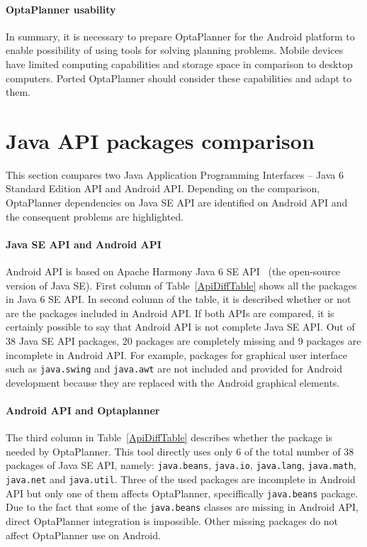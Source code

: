 \paragraph{OptaPlanner usability}
In summary, it is necessary to prepare OptaPlanner for the Android platform to enable possibility of using tools for
solving planning problems. Mobile devices have limited computing capabilities and storage space in comparison to desktop
computers. Ported OptaPlanner should consider these capabilities and adapt to them.

\section{Java API packages comparison}\label{ComparsionSection}
This section compares two Java Application Programming Interfaces -- Java 6 Standard Edition API and Android API.
Depending on the comparison, OptaPlanner dependencies on Java SE API are identified on Android API and the consequent
problems are highlighted.

\paragraph{Java SE API and Android API}
Android API is based on Apache Harmony Java 6 SE API~\cite{Apache} (the open-source version of Java SE). First column of
Table~\ref{ApiDiffTable} shows all the packages in Java 6 SE API. In second column of the table, it is described whether
or not are the packages included in Android API. If both APIs are compared, it is certainly possible to say that Android
API is not complete Java SE API. Out of 38 Java SE API packages, 20 packages are completely missing and 9 packages are
incomplete in Android API. For example, packages for graphical user interface such as \texttt{java.swing} and
\texttt{java.awt} are not included and provided for Android development because they are replaced with the Android
graphical elements.

\paragraph{Android API and Optaplanner}
The third column in Table~\ref{ApiDiffTable} describes whether the package is needed by OptaPlanner. This tool directly
uses only 6 of the total number of 38 packages of Java SE API, namely: \texttt{java.beans}, \texttt{java.io},
\texttt{java.lang}, \texttt{java.math}, \texttt{java.net} and \texttt{java.util}. Three of the used packages are
incomplete in Android API but only one of them affects OptaPlanner, speciffically \texttt{java.beans} package. Due to
the fact that some of the \texttt{java.beans} classes are missing in Android API, direct OptaPlanner integration is
impossible. Other missing packages do not affect OptaPlanner use on Android.


